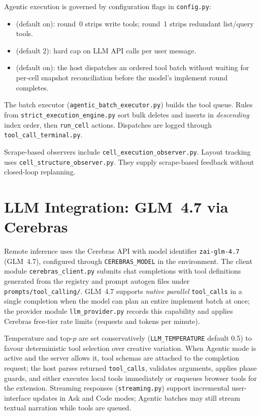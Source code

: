 Agentic execution is governed by configuration flags in \texttt{config.py}:
\begin{itemize}
  \item {\ttfamily{}} (default on): round~0 strips write tools; round~1 strips redundant list/query tools.
  \item {\ttfamily{}} (default 2): hard cap on \ac{LLM} \ac{API} calls per user message.
  \item {\ttfamily{}} (default on): the host dispatches an ordered tool batch without waiting for per-cell snapshot reconciliation before the model's implement round completes.
\end{itemize}

The batch executor (\texttt{agentic\_batch\_executor.py}) builds the tool queue. Rules from \texttt{strict\_execution\_engine.py} sort bulk deletes and inserts in \emph{descending} index order, then \texttt{run\_cell} actions. Dispatches are logged through \texttt{tool\_call\_terminal.py}.

Scrape-based observers include \texttt{cell\_execution\_observer.py}. Layout tracking uses \texttt{cell\_structure\_observer.py}. They supply scrape-based feedback without closed-loop replanning.

\section{LLM Integration: GLM~4.7 via Cerebras}
\label{sec:llm-integration}

Remote inference uses the Cerebras \ac{API} with model identifier \texttt{zai-glm-4.7} (GLM~4.7), configured through \texttt{CEREBRAS\_MODEL} in the environment. The client module \texttt{cerebras\_client.py} submits chat completions with tool definitions generated from the registry and prompt autogen files under \texttt{prompts/tool\_calling/}. GLM~4.7 supports \emph{native parallel} \texttt{tool\_calls} in a single completion when the model can plan an entire implement batch at once; the provider module \texttt{llm\_provider.py} records this capability and applies Cerebras free-tier rate limits (requests and tokens per minute).

Temperature and top-$p$ are set conservatively (\texttt{LLM\_TEMPERATURE} default 0.5) to favour deterministic tool selection over creative variation. When Agentic mode is active and the server allows it, tool schemas are attached to the completion request; the host parses returned \texttt{tool\_calls}, validates arguments, applies phase guards, and either executes local tools immediately or enqueues browser tools for the extension. Streaming responses (\texttt{streaming.py}) support incremental user-interface updates in Ask and Code modes; Agentic batches may still stream textual narration while tools are queued.

